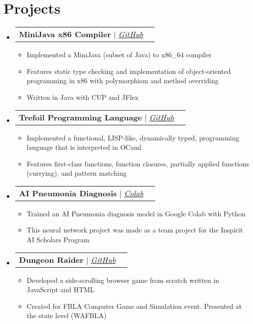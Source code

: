 \documentclass[letterpaper,11pt]{article}
\makeatletter
\newcommand{\resumeItem}[1]{
  \item\small{
    {#1 \vspace{-2pt}}
  }
}
\newcommand{\resumeProjectHeading}[2]{
    \vspace{-2pt}\item
    \begin{tabular*}{0.97\textwidth}{l@{\extracolsep{\fill}}r}
      \small#1 & #2 \\
    \end{tabular*}\vspace{-7pt}
}
\newcommand{\resumeSubHeadingListStart}{\begin{itemize}[leftmargin=0.15in, label={}]}
\newcommand{\resumeSubHeadingListEnd}{\end{itemize}}
\newcommand{\resumeItemListStart}{\begin{itemize}}
\newcommand{\resumeItemListEnd}{\end{itemize}\vspace{-5pt}}
\makeatother
\begin{document}

\section{Projects}
    \vspace{3pt}
    \resumeSubHeadingListStart
      
      \resumeProjectHeading
        {\textbf{MiniJava x86 Compiler} $|$ \emph{\href{https://github.com/Vladimirtrif/MiniJava-x86-Compiler/tree/master}{\color{blue}GitHub}}}{}
          \resumeItemListStart
            \resumeItem{Implemented a MiniJava (subset of Java) to x86\_64 compiler}
            \resumeItem{Features static type checking and implementation of object-oriented programming in x86 with polymorphism and method overriding}
            \resumeItem{Written in Java with CUP and JFlex}
      \resumeItemListEnd
      
      \resumeProjectHeading
        {\textbf{Trefoil Programming Language} $|$ \emph{\href{https://github.com/Vladimirtrif/trefoil}{\color{blue}GitHub}}}{}
          \resumeItemListStart
            \resumeItem{Implemented a functional, LISP-like, dynamically typed, programming language that is interpreted in OCaml}
            \resumeItem{Features first-class functions, function closures, partially applied functions (currying), and pattern matching}
      \resumeItemListEnd
      
      \resumeProjectHeading
        {\textbf{AI Pneumonia Diagnosis} $|$ \emph{\href{https://drive.google.com/drive/folders/1L4dHkkq_Mn3XkGTIh0rnGlhvCqryG1bR?usp=sharing}{\color{blue}Colab}}}{}
          \resumeItemListStart
            \resumeItem{Trained an AI Pneumonia diagnosis model in Google Colab with Python}
            \resumeItem{This neural network project was made as a team project for the Inspirit AI Scholars Program}
      \resumeItemListEnd

      \resumeProjectHeading
        {\textbf{Dungeon Raider} $|$ \emph{\href{https://github.com/Vladimirtrif/DungeonRaider}{\color{blue}GitHub}}}{}
          \resumeItemListStart
            \resumeItem{ Developed a side-scrolling browser game from scratch written in JavaScript and HTML}
            \resumeItem{ Created for FBLA Computer Game and Simulation event. Presented at the state level (WAFBLA)}
      \resumeItemListEnd

      
    \resumeSubHeadingListEnd

\end{document}
